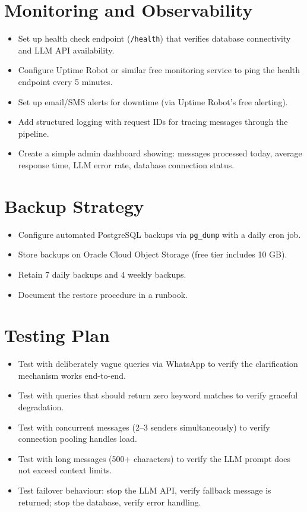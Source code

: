 \documentclass[12pt, a4paper]{report}
\begin{document}
\section{Monitoring and Observability}

\begin{itemize}[itemsep=3pt]
    \item Set up health check endpoint (\texttt{/health}) that verifies database connectivity and LLM API availability.
    \item Configure Uptime Robot or similar free monitoring service to ping the health endpoint every 5 minutes.
    \item Set up email/SMS alerts for downtime (via Uptime Robot's free alerting).
    \item Add structured logging with request IDs for tracing messages through the pipeline.
    \item Create a simple admin dashboard showing: messages processed today, average response time, LLM error rate, database connection status.
\end{itemize}

\section{Backup Strategy}

\begin{itemize}[itemsep=3pt]
    \item Configure automated PostgreSQL backups via \texttt{pg\_dump} with a daily cron job.
    \item Store backups on Oracle Cloud Object Storage (free tier includes 10 GB).
    \item Retain 7 daily backups and 4 weekly backups.
    \item Document the restore procedure in a runbook.
\end{itemize}

\section{Testing Plan}

\begin{itemize}[itemsep=3pt]
    \item Test with deliberately vague queries via WhatsApp to verify the clarification mechanism works end-to-end.
    \item Test with queries that should return zero keyword matches to verify graceful degradation.
    \item Test with concurrent messages (2--3 senders simultaneously) to verify connection pooling handles load.
    \item Test with long messages (500+ characters) to verify the LLM prompt does not exceed context limits.
    \item Test failover behaviour: stop the LLM API, verify fallback message is returned; stop the database, verify error handling.
\end{itemize}
\end{document}
